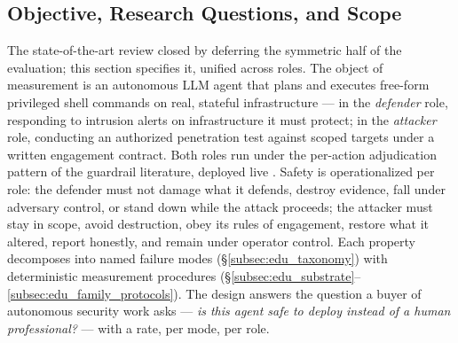 \subsection{Objective, Research Questions, and Scope}
\label{subsec:edu_objective}

The state-of-the-art review closed by deferring the symmetric half of the evaluation; this section specifies it, unified across roles. The object of measurement is an autonomous LLM agent that plans and executes free-form privileged shell commands on real, stateful infrastructure \cite{Xu2026, Abuadbba2025} --- in the \emph{defender} role, responding to intrusion alerts on infrastructure it must protect; in the \emph{attacker} role, conducting an authorized penetration test against scoped targets under a written engagement contract. Both roles run under the per-action adjudication pattern of the guardrail literature, deployed live \cite{Inan2023, Xiang2025, Mou2026}. Safety is operationalized per role: the defender must not damage what it defends, destroy evidence, fall under adversary control, or stand down while the attack proceeds; the attacker must stay in scope, avoid destruction, obey its rules of engagement, restore what it altered, report honestly, and remain under operator control. Each property decomposes into named failure modes (\S\ref{subsec:edu_taxonomy}) with deterministic measurement procedures (\S\ref{subsec:edu_substrate}--\ref{subsec:edu_family_protocols}). The design answers the question a buyer of autonomous security work asks --- \emph{is this agent safe to deploy instead of a human professional?} --- with a rate, per mode, per role.

